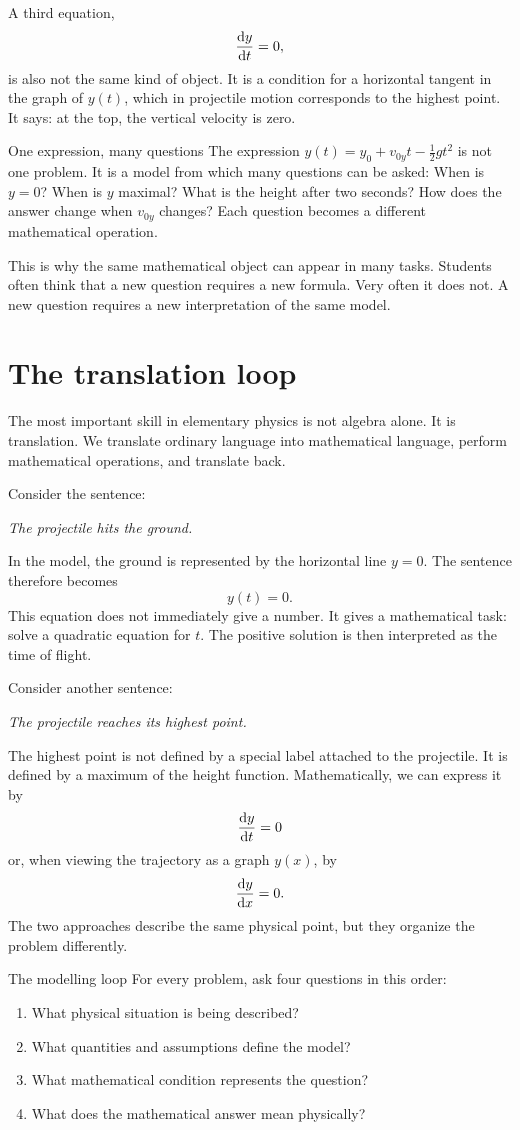 \documentclass[11pt,a4paper]{article}
\begin{document}
A third equation,
\[
\dv{y}{t}=0,
\]
is also not the same kind of object. It is a condition for a horizontal tangent in the graph of $y(t)$, which in projectile motion corresponds to the highest point. It says: at the top, the vertical velocity is zero.

\begin{principlebox}{One expression, many questions}
The expression $y(t)=y_0+v_{0y}t-\frac12gt^2$ is not one problem. It is a model from which many questions can be asked: When is $y=0$? When is $y$ maximal? What is the height after two seconds? How does the answer change when $v_{0y}$ changes? Each question becomes a different mathematical operation.
\end{principlebox}

This is why the same mathematical object can appear in many tasks. Students often think that a new question requires a new formula. Very often it does not. A new question requires a new interpretation of the same model.

\section{The translation loop}

The most important skill in elementary physics is not algebra alone. It is translation. We translate ordinary language into mathematical language, perform mathematical operations, and translate back.

Consider the sentence:

\emph{The projectile hits the ground.}

In the model, the ground is represented by the horizontal line $y=0$. The sentence therefore becomes
\[
y(t)=0.
\]
This equation does not immediately give a number. It gives a mathematical task: solve a quadratic equation for $t$. The positive solution is then interpreted as the time of flight.

Consider another sentence:

\emph{The projectile reaches its highest point.}

The highest point is not defined by a special label attached to the projectile. It is defined by a maximum of the height function. Mathematically, we can express it by
\[
\dv{y}{t}=0
\]
or, when viewing the trajectory as a graph $y(x)$, by
\[
\dv{y}{x}=0.
\]
The two approaches describe the same physical point, but they organize the problem differently.

\begin{methodbox}{The modelling loop}
For every problem, ask four questions in this order:
\begin{enumerate}
    \item What physical situation is being described?
    \item What quantities and assumptions define the model?
    \item What mathematical condition represents the question?
    \item What does the mathematical answer mean physically?
\end{enumerate}
\end{methodbox}
\end{document}
